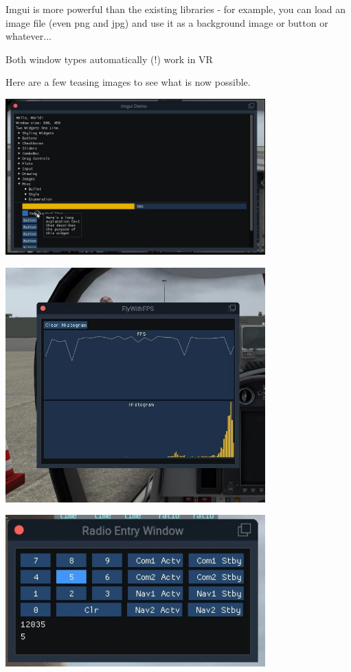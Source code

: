 \documentclass[11pt,parskip=half,a4paper]{scrartcl}
\begin{document}
\hspace*{10mm}	Imgui is more powerful than the existing libraries - for example, you can load an image
\hspace*{10mm}	file (even png and jpg) and use it as a background image or button or whatever...

\hspace*{10mm}	Both window types automatically (!) work in VR

Here are a few teasing images to see what is now possible.

\newpage
\begin{center}
\includegraphics[width=10cm]{imgui_demo.jpg} 
\end{center}

\begin{center}
\includegraphics[width=10cm]{imgui_plots.jpg}
\end{center}

\newpage
\begin{center}
\includegraphics[width=10cm]{Radio_Entry_Window.jpg}
\end{center}
\end{document}
